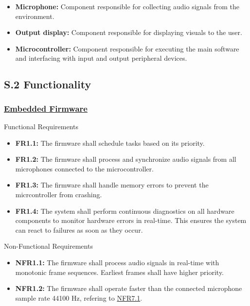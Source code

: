 \documentclass[12pt]{article}
\theoremstyle{definition}
\begin{document}
\begin{itemize}
  \item \textbf{Microphone:}\label{comp:microphone}
  Component responsible for collecting audio signals from the environment.

  \item \textbf{Output display:}\label{comp:display} Component responsible for
  displaying visuals to the user.

  \item \textbf{Microcontroller:}
  \label{comp:microcontroller} Component responsible for executing the main
  software and interfacing with input and output peripheral devices.
\end{itemize}

\subsection{S.2 Functionality}

\subsubsection{\hyperref[comp:embedded_firmware]{Embedded Firmware}}
Functional Requirements
\begin{itemize}
  \item \label{FR1_1}\textbf{FR1.1:} The firmware shall schedule tasks
  based on its priority.
  
  \item \label{FR1_2}\textbf{FR1.2:} The firmware shall process and
  synchronize audio signals from all microphones connected to the
  microcontroller.

  \item \label{FR1_3}\textbf{FR1.3:} The firmware shall handle memory errors to
  prevent the micrcontroller from crashing.

  \item \label{FR1_4}\textbf{FR1.4:} The system shall perform continuous
  diagnostics on all hardware components to monitor hardware errors in
  real-time. This ensures the system can react to failures as soon as they 
  occur.
\end{itemize}

Non-Functional Requirements
\begin{itemize}
  \item \label{NFR1_1}\textbf{NFR1.1:} The firmware shall process audio
  signals in real-time with monotonic frame sequences. Earliest frames shall
  have higher priority.
  
  \item \label{NFR1_2}\textbf{NFR1.2:} The firmware shall operate
  faster than the connected microphone sample rate 44100 Hz, refering to
  \hyperref[NFR7_1]{NFR7.1}.
\end{itemize}
\end{document}
